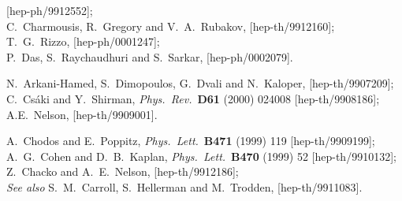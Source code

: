 \documentclass[a4paper,12pt]{article}
\begin{document}
\begin{thebibliography}{99}
[hep-ph/9912552];\\
%
C.~Charmousis, R.~Gregory and V.~A.~Rubakov,
[hep-th/9912160];\\
%
T.~G.~Rizzo,
[hep-ph/0001247];\\
%
P.~Das, S.~Raychaudhuri and S.~Sarkar,
[hep-ph/0002079].




N.~Arkani-Hamed, S.~Dimopoulos, G.~Dvali and N.~Kaloper,
[hep-th/9907209];\\
%
C.~Cs\'aki and Y.~Shirman,
{\it Phys.\ Rev.}\  {\bf D61} (2000) 024008
[hep-th/9908186];\\
%
A.E.~Nelson,
[hep-th/9909001].



A.~Chodos and E.~Poppitz,
{\it Phys.\ Lett.}\  {\bf B471} (1999) 119
[hep-th/9909199];\\
%
A.~G.~Cohen and D.~B.~Kaplan,
{\it Phys.\ Lett.}\  {\bf B470} (1999) 52
[hep-th/9910132];\\
%
Z.~Chacko and A.~E.~Nelson,
[hep-th/9912186];\\
%
{\it See also} S.~M.~Carroll, S.~Hellerman and M.~Trodden,
[hep-th/9911083].




\end{thebibliography}
\end{document}
